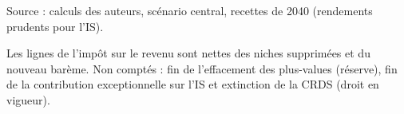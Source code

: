 Source : calculs des auteurs, scénario central, recettes de 2040 (rendements prudents pour l'IS).\par Les lignes de l'impôt sur le revenu sont nettes des niches supprimées et du nouveau barème. Non comptés : fin de l'effacement des plus-values (réserve), fin de la contribution exceptionnelle sur l'IS et extinction de la CRDS (droit en vigueur).
